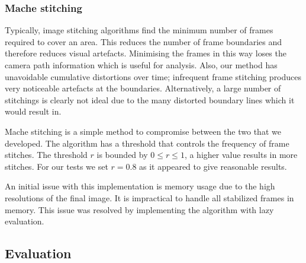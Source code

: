 \subsubsection{Mache stitching}

Typically, image stitching algorithms find the minimum number of frames required to cover an area.
This reduces the number of frame boundaries and therefore reduces visual artefacts.
Minimising the frames in this way loses the camera path information which is useful for analysis.
Also, our method has unavoidable cumulative distortions over time;
infrequent frame stitching produces very noticeable artefacts at the boundaries.
Alternatively, a large number of stitchings is clearly not ideal due to the many distorted boundary lines which it would result in.

Mache stitching is a simple method to compromise between the two that we developed.
The algorithm has a threshold that controls the frequency of frame stitches.
The threshold $r$ is bounded by $0\leq r \leq1$, a higher value results in more stitches.
For our tests we set $r=0.8$ as it appeared to give reasonable results.

\begin{algorithmic}
    \ENDIF
  \ENDFOR
\end{algorithmic}

An initial issue with this implementation is memory usage due to the high resolutions of the final image.
It is impractical to handle all stabilized frames in memory.
This issue was resolved by implementing the algorithm with lazy evaluation.

\subsection{Evaluation}

